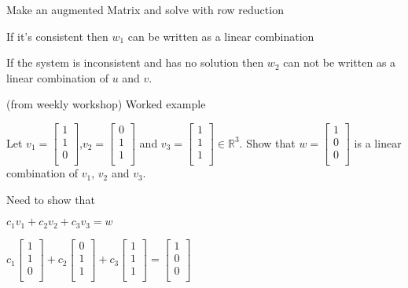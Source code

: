 \documentclass{extarticle}
\begin{document}
\begin{tcolorbox}[enhanced jigsaw,sharp corners,coltext=black,colback=BurntOrange!25!white,boxrule=0pt,breakable,size=minimal]
Make an augmented Matrix and solve with row reduction

If it's consistent then $w_1$ can be written as a linear combination

If the system is inconsistent and has no solution then $w_2$ can not be written as a linear combination of $u$ and $v$.

\end{tcolorbox}

(from weekly workshop)
Worked example

Let 
$v_1=\left[\begin{matrix}1\\1\\0\\\end{matrix}\right]$,$v_2=\left[\begin{matrix}0\\1\\1\\\end{matrix}\right]$ and $v_3=\left[\begin{matrix}1\\1\\1\\\end{matrix}\right]$$\in{\mathbb{R}}^3$.
Show that
$w=\left[\begin{matrix}1\\0\\0\\\end{matrix}\right]$
is a linear combination of $v_1$, $v_2$ and $v_3$.

Need to show that

$c_1v_1+c_2v_2+ c_3v_3=w$

$c_1\left[\begin{matrix}1\\1\\0\\\end{matrix}\right]+c_2\left[\begin{matrix}0\\1\\1\\\end{matrix}\right]+ c_3\left[\begin{matrix}1\\1\\1\\\end{matrix}\right]=\left[\begin{matrix}1\\0\\0\\\end{matrix}\right]$
\end{document}

